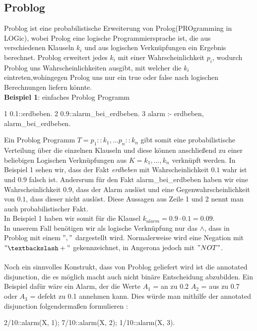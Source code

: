 \documentclass[german,version-2020-11]{uzl-thesis}
\begin{document}
\subsection{Problog}
Problog ist eine probabilistische Erweiterung von Prolog(PROgramming in LOGic), wobei Prolog eine logische Programmiersprache ist, die aus verschiedenen Klauseln $k_i$ und aus logischen Verknüpfungen ein Ergebnis berechnet. Problog erweitert jedes $k_i$ mit einer Wahrscheinlichkeit $p_i$, wodurch Problog uns Wahrscheinlichkeiten ausgibt, mit welcher die $k_i$ eintreten,wohingegen  Prolog uns nur ein true oder false nach logischen Berechnungen liefern könnte. \\ 
\textbf{Beispiel 1}: einfaches Problog Programm
\begin{Pseudocode}
1	0.1::erdbeben.
2	0.9::alarm_bei_erdbeben.
3	alarm :- erdbeben, alarm_bei_erdbeben.
\end{Pseudocode} 
Ein Problog Programm $T = {p_1 :: k_1, ... p_n :: k_n}$ gibt somit eine probabilistische Verteilung über die einzelnen Klauseln und diese können anschließend zu einer beliebigen Logischen Verknüpfungen aus $K = {k_1 , ... , k_n}$ verknüpft werden. In Beispiel 1 sehen wir, dass der Fakt \textit{erdbeben} mit Wahrscheinlichkeit $0.1$ wahr ist und $0.9$ falsch ist. Andersrum für den Fakt alarm\_bei\_erdbeben haben wir eine Wahrscheinlichkeit $0.9$, dass der Alarm auslöst und eine Gegenwahrscheinlichkeit von $0.1$, dass dieser nicht auslöst. Diese Aussagen aus Zeile 1 und 2 nennt man auch probabilistischer Fakt.\\  In Beispiel 1 haben wir somit für die Klausel $k_{alarm} = 0.9 \cdot 0.1 = 0.09  $. \cite{4}\cite{5} \\ 
In unserem Fall benötigen wir als logische Verknüpfung nur das $\land$, dass in Problog mit einem $","$ dargestellt wird. Normalerweise wird eine Negation mit $"\textbackslash+"$ gekennzeichnet, in Angerona jedoch mit $"NOT"$.\\ \\
Noch ein sinnvolles Konstrukt, dass von Problog geliefert wird ist die annotated disjunction, die es möglich macht auch nicht binäre Entscheidung abzubilden. Ein Beispiel dafür wäre ein Alarm, der die Werte $A_1$ = an zu 0.2  $A_2$ = aus zu 0.7 oder $A_3$ = defekt zu 0.1 annehmen kann. Dies würde man mithilfe der annotated disjunction folgendermaßen formulieren : 
\begin{Pseudocode}
2/10::alarm(X, 1); 7/10::alarm(X, 2); 1/10::alarm(X, 3).
\end{Pseudocode}
\end{document}
